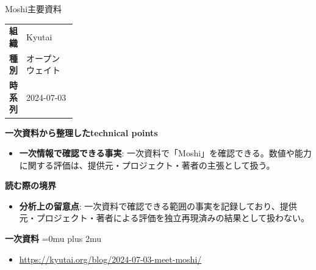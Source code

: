 \begin{technicalnote}{Moshi}{主要資料}
\begingroup
\begin{tabularx}{\linewidth}{@{}>{\bfseries}p{0.22\linewidth}X@{}}
組織 & Kyutai \\
種別 & オープンウェイト \\
時系列 & 2024-07-03 \\
\end{tabularx}
\smallskip
{\bfseries 一次資料から整理したtechnical points}
\begin{itemize}[leftmargin=1.5em,itemsep=0.35em]
\item \textbf{一次情報で確認できる事実}: 一次資料で「Moshi」を確認できる。数値や能力に関する評価は、提供元・プロジェクト・著者の主張として扱う。
\end{itemize}
\begin{minipage}{\linewidth}
{\bfseries 読む際の境界}
\begin{itemize}[leftmargin=1.5em,itemsep=0.35em]
\item \textbf{分析上の留意点}: 一次資料で確認できる範囲の事実を記録しており、提供元・プロジェクト・著者による評価を独立再現済みの結果として扱わない。
\end{itemize}
\begin{samepage}
{\bfseries 一次資料}
\begingroup\sloppy
\Urlmuskip=0mu plus 2mu\relax
\begin{itemize}[leftmargin=1.5em,itemsep=0.25em]
\item {\scriptsize\url{https://kyutai.org/blog/2024-07-03-meet-moshi/}}
\end{itemize}
\endgroup
\end{samepage}
\end{minipage}
\endgroup
\end{technicalnote}
\medskip

